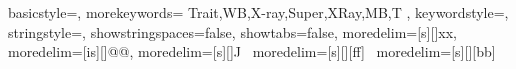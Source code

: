 \usepackage{listings}
\usepackage{subfiles}
\usepackage{textcomp}
\usepackage{xcolor}
\usepackage[ampersand]{easylist}

{
  basicstyle=\ttfamily,
  morekeywords={
  Trait,WB,X-ray,Super,XRay,MB,T
  },
  keywordstyle=\color{red},
  stringstyle=\color{red},
  showstringspaces=false,
  showtabs=false,
  moredelim=[s][\color{blue}]{x}{x},
  moredelim=[is][\color{violet}]{@}{@},
  moredelim=[s][\color{gray}]{J}{\ }
  moredelim=[s][\color{green}][ff]{\ }
  moredelim=[s][\color{green}][bb]{\ }
}